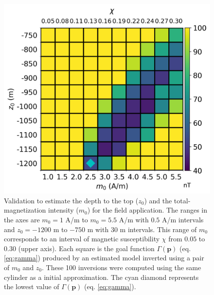 \begin{figure}
	\centering
	\includegraphics[scale=.75]{figures/real_gamma.png}
	\caption{Validation to estimate the depth to the top ($ z_0 $) and the total-magnetization intensity ($ m_0 $) for the field application. The ranges in the axes are $m_0 = 1$ A/m to $m_0=5.5$ A/m with $0.5$ A/m intervals and $z_0=-1200$ m to $-750$ m with $30$ m intervals. This range of $m_0$ corresponds to an interval of magnetic susceptibility $\chi$ from $0.05$ to $0.30$ (upper axis). Each square is the goal function $ \Gamma(\mathbf{p}) $ (eq. \ref{eq:gamma}) produced by an estimated model inverted using a pair of $m_0$ and $z_0$. These 100 inversions were computed using the same cylinder as a initial approximation. The cyan diamond represents the lowest value of $ \Gamma(\mathbf{p}) $ (eq. \ref{eq:gamma}).
	}
	\label{fig:real_map}
\end{figure}

